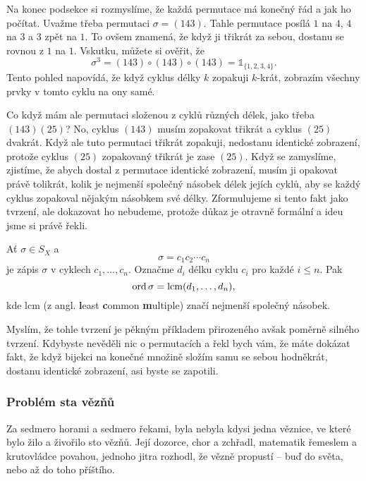 Na konec podsekce si rozmyslíme, že každá permutace má konečný řád a jak ho
počítat. Uvažme třeba permutaci $\sigma = (143)$. Tahle permutace posílá $1$ na
$4$, $4$ na $3$ a $3$ zpět na $1$. To ovšem znamená, že když ji 
třikrát za sebou, dostanu se rovnou z $1$ na $1$. Vskutku, můžete si ověřit, že
\[
 \sigma^3 = (143) \circ (143) \circ (143) = \mathds{1}_{\{1,2,3,4\}}.
\]
Tento pohled napovídá, že když cyklus délky $k$ zopakuji $k$-krát, zobrazím
všechny prvky v tomto cyklu na ony samé.

Co když mám ale permutaci složenou z cyklů různých délek, jako třeba
$(143)(25)$? No, cyklus $(143)$ musím zopakovat třikrát a cyklus $(25)$ dvakrát.
Když ale tuto permutaci třikrát zopakuji, nedostanu identické zobrazení, protože
cyklus $(25)$ zopakovaný třikrát je zase $(25)$. Když se zamyslíme, zjistíme, že
abych dostal z permutace identické zobrazení, musím ji opakovat právě tolikrát,
kolik je nejmenší společný násobek délek jejích cyklů, aby se každý cyklus
zopakoval nějakým násobkem své délky. Zformulujeme si tento fakt jako tvrzení,
ale dokazovat ho nebudeme, protože důkaz je otravně formální a ideu jsme si
právě řekli.

\begin{claim}
 Ať $\sigma \in S_X$ a
 \[
  \sigma = c_1c_2\cdots c_n
 \]
 je zápis $\sigma$ v cyklech $c_1,\ldots,c_n$. Označme $d_i$ délku cyklu $c_i$ 
 pro každé $i \leq n$. Pak
 \[
  \operatorname{ord} \sigma = \mathrm{lcm}(d_1,\ldots,d_n),
 \]
 kde $\mathrm{lcm}$ (z angl. \textbf{l}east \textbf{c}ommon \textbf{m}ultiple)
 značí nejmenší společný násobek.
\end{claim}

Myslím, že tohle tvrzení je pěkným příkladem přirozeného avšak poměrně silného
tvrzení. Kdybyste nevěděli nic o permutacích a řekl bych vám, že máte dokázat
fakt, že když bijekci na konečné množině složím samu se sebou hodněkrát, dostanu
identické zobrazení, asi byste se zapotili.

\subsubsection{Problém sta vězňů}
\label{sssec:problem-sta-veznu}

Za sedmero horami a sedmero řekami, byla nebyla kdysi jedna věznice, ve které
bylo žilo a živořilo sto vězňů. Její dozorce, chor a zchřadl, matematik řemeslem
a krutovládce povahou, jednoho jitra rozhodl, že vězně propustí -- buď do světa,
nebo až do toho příštího.

